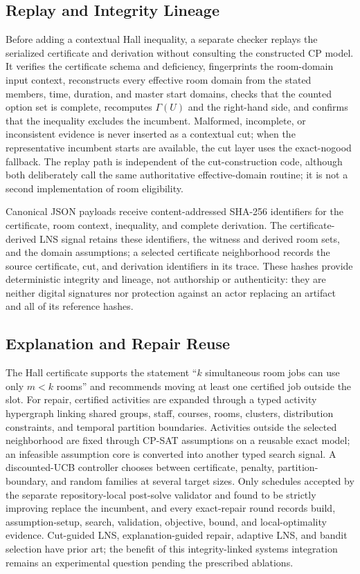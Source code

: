 \subsection{Replay and Integrity Lineage}
Before adding a contextual Hall inequality, a separate checker replays the serialized certificate and derivation without consulting the constructed CP model.
It verifies the certificate schema and deficiency, fingerprints the room-domain input context, reconstructs every effective room domain from the stated members, time, duration, and master start domains, checks that the counted option set is complete, recomputes $\Gamma(U)$ and the right-hand side, and confirms that the inequality excludes the incumbent.
Malformed, incomplete, or inconsistent evidence is never inserted as a contextual cut; when the representative incumbent starts are available, the cut layer uses the exact-nogood fallback.
The replay path is independent of the cut-construction code, although both deliberately call the same authoritative effective-domain routine; it is not a second implementation of room eligibility.

Canonical JSON payloads receive content-addressed SHA-256 identifiers for the certificate, room context, inequality, and complete derivation.
The certificate-derived LNS signal retains these identifiers, the witness and derived room sets, and the domain assumptions; a selected certificate neighborhood records the source certificate, cut, and derivation identifiers in its trace.
These hashes provide deterministic integrity and lineage, not authorship or authenticity: they are neither digital signatures nor protection against an actor replacing an artifact and all of its reference hashes.

\subsection{Explanation and Repair Reuse}
The Hall certificate supports the statement ``$k$ simultaneous room jobs can use only $m<k$ rooms'' and recommends moving at least one certified job outside the slot.
For repair, certified activities are expanded through a typed activity hypergraph linking shared groups, staff, courses, rooms, clusters, distribution constraints, and temporal partition boundaries.
Activities outside the selected neighborhood are fixed through CP-SAT assumptions on a reusable exact model; an infeasible assumption core is converted into another typed search signal.
A discounted-UCB controller chooses between certificate, penalty, partition-boundary, and random families at several target sizes.
Only schedules accepted by the separate repository-local post-solve validator and found to be strictly improving replace the incumbent, and every exact-repair round records build, assumption-setup, search, validation, objective, bound, and local-optimality evidence.
Cut-guided LNS, explanation-guided repair, adaptive LNS, and bandit selection have prior art; the benefit of this integrity-linked systems integration remains an experimental question pending the prescribed ablations.
